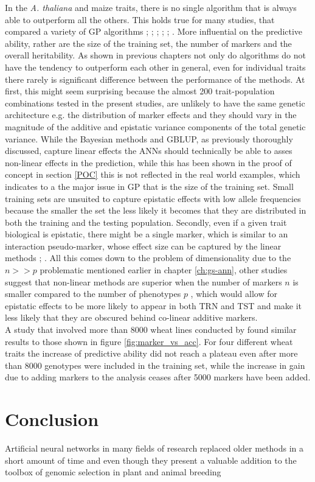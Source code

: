 In the \textit{A. thaliana} and maize traits, there is no single algorithm that is always
able to outperform all the others. This holds true for many studies, that compared a
variety of GP algorithms \cite{dlc2009}; \cite{heslot2012genomic};
\cite{blondel2015ranking}; \cite{Ramstein_2016}; \cite{roorkiwal2016genome};
\cite{azodi2019}. More influential on the predictive ability, rather are the size of the
training set, the number of markers and the overall heritability. As shown in previous
chapters not only do algorithms do not have the tendency to outperform each other in
general, even for individual traits there rarely is significant difference between the
performance of the methods. At first, this might seem surprising because the almost 200
trait-population combinations tested in the present studies, are unlikely to have the same
genetic architecture e.g. the distribution of marker effects and they should vary in the
magnitude of the additive and epistatic variance components of the total genetic
variance. While the Bayesian methods and GBLUP, as previously thoroughly discussed,
capture linear effects the ANNs should technically be able to asses non-linear effects in
the prediction, while this has been shown in the proof of concept in section \ref{POC}
this is not reflected in the real world examples, which indicates to a the major issue in
GP that is the size of the training set. Small training sets are unsuited to capture
epistatic effects with low allele frequencies because the smaller the set the less likely
it becomes that they are distributed in both the training and the testing
population. Secondly, even if a given trait biological is epistatic, there might be a
single marker, which is similar to an interaction pseudo-marker, whose effect size can be
captured by the linear methods \cite{hill2008data}; \cite{monir2018dominance}. All this
comes down to the problem of dimensionality due to the $n >> p$ problematic mentioned
earlier in chapter \ref{ch:gs-ann}, other studies suggest that non-linear methods are
superior when the number of markers $n$ is smaller compared to the number of phenotypes
$p$ \cite{azodi2019}, which would allow for epistatic effects to be more likely to appear
in both TRN and TST and make it less likely that they are obscured behind co-linear
additive markers.\\
A study that involved more than 8000 wheat lines conducted by \cite{Norman_2018} found
similar results to those shown in figure \ref{fig:marker_vs_acc}. For four different wheat
traits the increase of predictive ability did not reach a plateau even after more than
8000 genotypes were included in the training set, while the increase in gain due to adding
markers to the analysis ceases after 5000 markers have been added.


\section{Conclusion}
Artificial neural networks in many fields of research replaced older methods in a short
amount of time and even though they present a valuable addition to the toolbox of genomic
selection in plant and animal breeding



